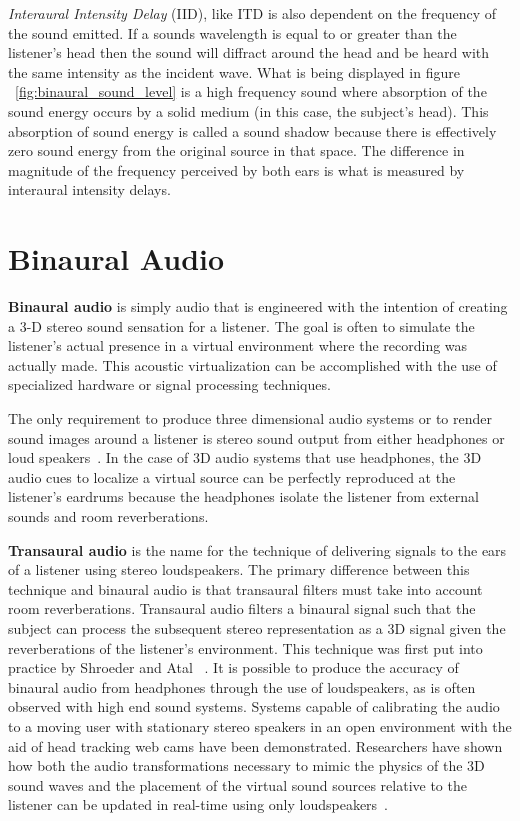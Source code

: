 \textit{Interaural Intensity Delay} (IID), like ITD is also dependent on the
frequency of the sound emitted.  If a sounds wavelength is equal to or greater
than the listener's head then the sound will diffract around the head and be
heard with the same intensity as the incident wave.  What is being displayed in
figure ~\ref{fig:binaural_sound_level} is a high frequency sound where
absorption of the sound energy occurs by a solid medium (in this case, the
subject's head). This absorption of sound energy is called a sound shadow
because there is effectively zero sound energy from the original source in that
space. The  difference in magnitude of the frequency perceived by both ears is
what is  measured by interaural intensity delays.


\section{                  Binaural Audio                                     }

\textbf{Binaural audio} is simply audio that is engineered with the intention
of creating a 3-D stereo sound sensation for a listener.  The goal is often to
simulate the listener's actual presence in a virtual environment where the
recording was actually made. This acoustic virtualization can be accomplished
with the use of specialized hardware or signal processing techniques.

The only requirement to produce three dimensional audio systems or to render
sound images around a listener is stereo sound output from either headphones
or loud speakers~\cite{thackara2005bubble}. In the case of 3D audio systems
that use headphones, the 3D audio cues to localize a virtual source can be
perfectly reproduced at the listener’s eardrums because the headphones isolate
the listener from external sounds and room reverberations.

\textbf{Transaural audio} is the name for the technique of delivering signals to
the ears of a listener using stereo loudspeakers. The primary difference between
this technique and binaural audio is that transaural filters must take into
account room reverberations.  Transaural audio filters a binaural signal such
that the subject can process the subsequent stereo representation as a 3D signal
given the reverberations of the listener's environment.  This technique was
first put into practice by Shroeder and Atal ~\cite{ schroeder1963computer,
schroeder1970digital }. It is possible to produce the accuracy of binaural audio
from headphones through the use of loudspeakers, as is often observed with high
end sound systems. Systems capable of calibrating the audio to a moving user
with stationary stereo speakers in an open  environment with the aid of head
tracking web cams have been demonstrated. Researchers have shown how both the
audio transformations necessary to mimic the physics of the 3D sound waves and
the placement of the virtual sound sources relative to the listener can be
updated in real-time using only loudspeakers~\cite{song2010personal}.

